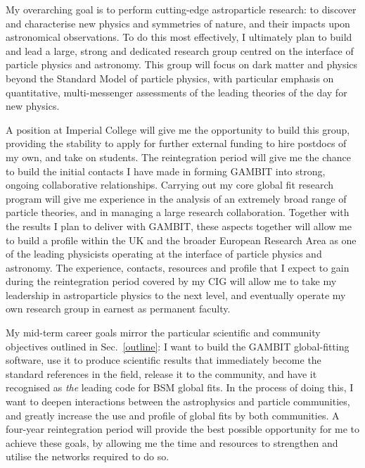 \documentclass[a4paper,11pt]{article}
\begin{document}
My overarching goal is to perform cutting-edge astroparticle research: to discover and characterise new physics and symmetries of nature, and their impacts upon astronomical observations. To do this most effectively, I ultimately plan to build and lead a large, strong and dedicated research group centred on the interface of particle physics and astronomy. This group will focus on dark matter and physics beyond the Standard Model of particle physics, with particular emphasis on quantitative, multi-messenger assessments of the leading theories of the day for new physics.  

A position at Imperial College will give me the opportunity to build this group, providing the stability to apply for further external funding to hire postdocs of my own, and take on students.  The reintegration period will give me the chance to build the initial contacts I have made in forming GAMBIT into strong, ongoing collaborative relationships.  Carrying out my core global fit research program will give me experience in the analysis of an extremely broad range of particle theories, and in managing a large research collaboration.  Together with the results I plan to deliver with GAMBIT, these aspects together will allow me to build a profile within the UK and the broader European Research Area as one of the leading physicists operating at the interface of particle physics and astronomy.  The experience, contacts, resources and profile that I expect to gain during the reintegration period covered by my CIG will allow me to take my leadership in astroparticle physics to the next level, and eventually operate my own research group in earnest as permanent faculty.

My mid-term career goals mirror the particular scientific and community objectives outlined in Sec.\ \ref{outline}: I want to build the GAMBIT global-fitting software, use it to produce scientific results that immediately become the standard references in the field, release it to the community, and have it recognised as {\it the} leading code for BSM global fits.  In the process of doing this, I want to deepen interactions between the astrophysics and particle communities, and greatly increase the use and profile of global fits by both communities.  A four-year reintegration period will provide the best possible opportunity for me to achieve these goals, by allowing me the time and resources to strengthen and utilise the networks required to do so.

\end{document}
